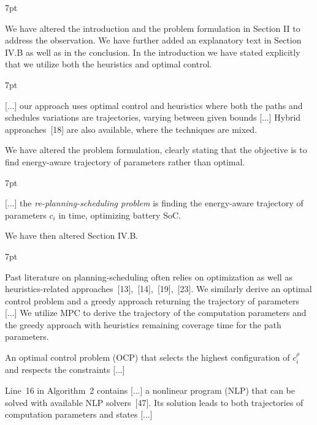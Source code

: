 \documentclass[10pt]{letter}
\newenvironment{formal}{%
  \def\FrameCommand{%
    \hspace{1pt}%
    {\color{red}\vrule width 2pt}%
    {\color{formalshade}\vrule width 4pt}%
    \colorbox{formalshade}%
  }%
  \MakeFramed{\advance\hsize-\width\FrameRestore}%
  \noindent\hspace{-4.55pt}%
  \begin{adjustwidth}{}{7pt}%
  \vspace{2pt}\vspace{2pt}%
}
{%
  \vspace{2pt}\end{adjustwidth}\endMakeFramed%
}
\begin{document}
{\begin{formal}
\begin{algorithmic}[1]
    \vspace*{.8ex}
  \end{algorithmic}
\end{formal}

  We have altered the introduction and the problem formulation in Section II to address the observation. We have further added an explanatory text in Section IV.B as well as in the conclusion. In the introduction we have stated explicitly that we utilize both the heuristics and optimal control.

  \begin{formal}
  {\color{black} [...] our approach uses optimal control {\color{blue} and heuristics} where both the paths and schedules variations are trajectories, varying between given bounds [...]} Hybrid approaches~[{\color{green}18}] are also available, where the techniques are mixed.
  \vspace*{1ex}
  \end{formal}

  We have altered the problem formulation, clearly stating that the objective is to find energy-aware trajectory of parameters rather than optimal.

  \begin{formal}
    {\color{black} [...] the \emph{re-planning-scheduling problem} is finding the {\color{blue}energy-aware} trajectory of parameters $c_i$ in time{\color{blue}, optimizing battery SoC}.}
    \vspace*{1ex}
  \end{formal}

  We have then altered Section IV.B.

  \begin{formal}
  \color{black}
  Past literature on planning-scheduling often relies on %
  optimization {\color{blue} as well as heuristics-}related approaches~[{\color{green}13}],~[{\color{green}14}],~[{\color{green}19}],~[{\color{green}23}]. We similarly derive an optimal control problem {\color{blue}and a greedy approach} returning the trajectory of parameters [...] {\color{blue} We utilize MPC to derive the trajectory of the computation parameters and the greedy approach with heuristics remaining coverage time for the path parameters.}

  An optimal control problem (OCP) that selects the highest configuration of {\color{blue} $c_i^\rho$} and respects the constraints [...]

  Line~{\color{red}16} in Algorithm~{\color{red}2} contains [...] a nonlinear program (NLP) that can be solved with available NLP solvers~[{\color{green}47}]. Its solution leads to both trajectories of {\color{blue} computation} parameters and states [...]
  

\end{formal}}
\end{document}
